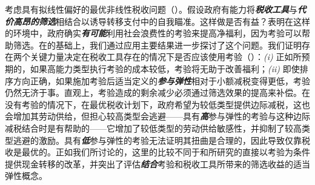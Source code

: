 \documentclass[12pt,letterpaper]{article}
\newenvironment{translation}{\color{blue}\noindent}{}
\theoremstyle{plain}
\theoremstyle{definition}
\theoremstyle{remark}
\renewcommand{\1}{\mathds{1}}
\theoremstyle{definition}
\begin{document}
\begin{translation}
考虑具有拟线性偏好的最优非线性税收问题（\citealt{diamond1998optimal}）。假设政府有能力将\textit{\textbf{税收工具}}与\textit{\textbf{代价高昂的筛选}}相结合以诱导转移支付中的自我瞄准。这样做是否有益？\citet{Nichols1982b}表明在这样的环境中，政府确实\textit{\textbf{有可能}}利用社会浪费性的考验来提高净福利，因为考验可以帮助筛选。在\citet{Nichols1982b}的基础上，我们通过应用主要结果进一步探讨了这个问题。我们证明存在两个关键力量决定在税收工具存在的情况下是否应该使用考验（）：\textit{(i)} 正如\citet{Nichols1982b}所预期的，如果高能力类型执行考验的成本较低，考验将无助于改善福利；\textit{(ii)} 即使排序方向正确，如果施加考验后适当定义的\textit{\textbf{参与弹性}}相对于小额减税变得更低，考验仍然无济于事。直观上，考验造成的剩余减少必须通过筛选效果的提高来补偿。在没有考验的情况下，在最优税收计划下，政府希望为较低类型提供边际减税，这也会增加其劳动供给，但担心较高类型会逃避——具有\textit{\textbf{高}}参与弹性的考验与这种边际减税结合时是有帮助的——它增加了较低类型的劳动供给敏感性，并抑制了较高类型逃避的激励。具有\textit{\textbf{低}}参与弹性的考验无法证明其扭曲是合理的，因此导致仅靠税收是最优的。正如我们所讨论的，这里的比较不同于\citet*{yang2023comparison}和\citet*{rafkin2023self}所研究的直接以考验为条件提供现金转移的改革，并突出了评估\textit{\textbf{结合}}考验和税收工具所带来的筛选收益的适当弹性概念。
\end{translation}
\end{document}
